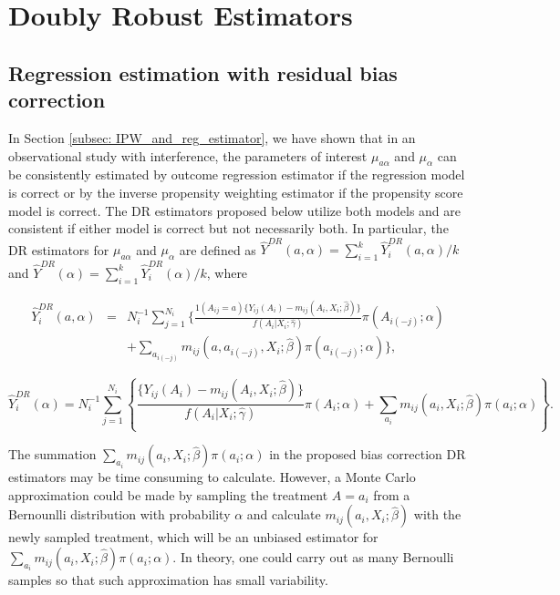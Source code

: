 \documentclass[oupdraft]{biostatistics}
\begin{document}
\vspace{-0.3cm}
\section{Doubly Robust Estimators}\label{subsec: DE_estimator}

\subsection{Regression estimation with residual bias correction}

 In Section \ref{subsec: IPW_and_reg_estimator}, we have shown that in an observational study with interference, the parameters of interest $\mu_{a\alpha}$ and $\mu_{\alpha}$ can be consistently estimated by outcome regression estimator if the regression model is correct or by the inverse propensity weighting estimator if the propensity score model is correct.
The DR estimators proposed below utilize both models and are consistent if either model is correct but not necessarily both. In particular, the DR estimators for $\mu_{a\alpha}$ and $\mu_{\alpha}$ are defined as  $ \widehat{Y}^{DR}(a,\alpha)= \sum_{i=1}^k\widehat{Y}_i^{DR}(a,\alpha)/k$ and $ \widehat{Y}^{DR}(\alpha)= \sum_{i=1}^k\widehat{Y}_i^{DR}(\alpha)/k$, where


\vspace{-0.8cm}
\begin{eqnarray*}\label{eq: DR_estimator}
  \widehat{Y}_i^{DR}(a,\alpha)&=&N_i^{-1}\sum_{j=1}^{N_i}\Biggl\{\frac{1(A_{ij}=a)\{Y_{ij}(A_i)-m_{ij}(A_i,X_i;\hat\beta)\}}{{f}(A_i|X_i;\hat\gamma)}
  \pi(A_{i(-j)};\alpha)\\&&+
  \sum_{a_{i(-j)}}m_{ij}(a,a_{i(-j)},X_i;\hat\beta)\pi(a_{i(-j)};\alpha)
 \Biggr\},
 \end{eqnarray*}

 \vspace{-0.6cm}
 \begin{equation*}
  \widehat{Y}_i^{DR}(\alpha)=N_i^{-1}\sum_{j=1}^{N_i}\left\{
 \frac{\{Y_{ij}(A_i)-m_{ij}(A_i,X_i;\hat\beta)\}}{{f}(A_i|X_i;\hat\gamma)}\pi(A_i;\alpha)+
  \sum_{a_i}m_{ij}(a_i,X_i;\hat\beta)\pi(a_i;\alpha)\right\}.
\end{equation*}


\noindent The summation $ \sum_{a_i}m_{ij}(a_i,X_i;\hat\beta)\pi(a_i;\alpha)$ in the proposed bias correction DR estimators may be time consuming to calculate. However, a Monte Carlo approximation could be made by sampling the treatment $A=a_i$ from a Bernounlli distribution with probability $\alpha$ and calculate $m_{ij}(a_i,X_i;\hat\beta)$ with the newly sampled treatment, which will be an unbiased estimator for $\sum_{a_i}m_{ij}(a_i,X_i;\hat\beta)\pi(a_i;\alpha)$. In theory, one could carry out as many Bernoulli samples so that such approximation has small variability.
\end{document}
